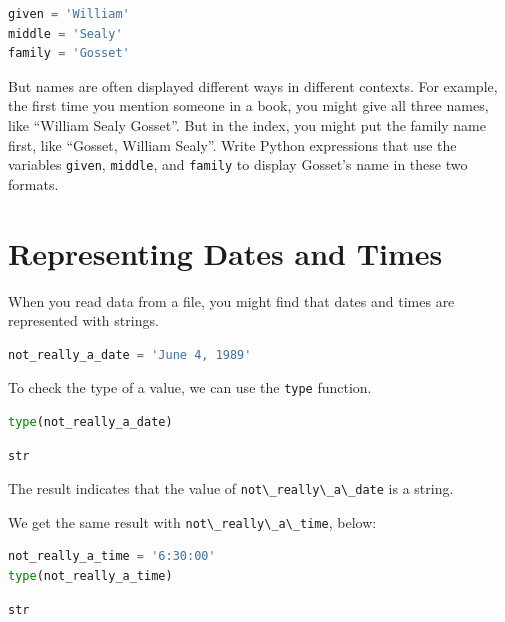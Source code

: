 \begin{lstlisting}[language=Python,style=source]
given = 'William'
middle = 'Sealy'
family = 'Gosset'
\end{lstlisting}

But names are often displayed different ways in different contexts. For
example, the first time you mention someone in a book, you might give
all three names, like ``William Sealy Gosset''. But in the index, you
might put the family name first, like ``Gosset, William Sealy''. Write
Python expressions that use the variables
\passthrough{\lstinline!given!}, \passthrough{\lstinline!middle!}, and
\passthrough{\lstinline!family!} to display Gosset's name in these two
formats.

\hypertarget{representing-dates-and-times}{%
\section{Representing Dates and
Times}\label{representing-dates-and-times}}

When you read data from a file, you might find that dates and times are
represented with strings.

\begin{lstlisting}[language=Python,style=source]
not_really_a_date = 'June 4, 1989'
\end{lstlisting}

To check the type of a value, we can use the
\passthrough{\lstinline!type!} function.

\begin{lstlisting}[language=Python,style=source]
type(not_really_a_date)
\end{lstlisting}

\begin{lstlisting}[style=output]
str
\end{lstlisting}

The result indicates that the value of
\passthrough{\lstinline!not\_really\_a\_date!} is a string.

We get the same result with
\passthrough{\lstinline!not\_really\_a\_time!}, below:

\begin{lstlisting}[language=Python,style=source]
not_really_a_time = '6:30:00'
type(not_really_a_time)
\end{lstlisting}

\begin{lstlisting}[style=output]
str
\end{lstlisting}


